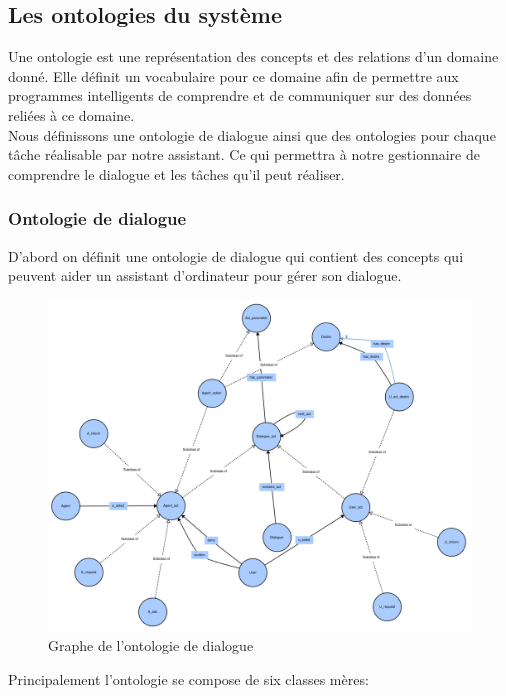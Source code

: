 \subsection{Les ontologies du système}\label{onto}
Une ontologie est une représentation des concepts et des relations d'un domaine donné. Elle définit un vocabulaire pour ce domaine afin de permettre aux programmes intelligents de comprendre  et de communiquer sur des données reliées à ce domaine.\\
Nous définissons une ontologie de dialogue ainsi que des ontologies pour chaque tâche réalisable par notre assistant. Ce qui permettra à notre gestionnaire de comprendre le dialogue et les tâches qu'il peut réaliser.
\subsubsection{Ontologie de dialogue}
D'abord on définit une ontologie de dialogue qui contient des concepts qui peuvent aider un assistant d'ordinateur pour gérer son dialogue.
\begin{figure}[H] 
	
	\centering
	\includegraphics[width=0.95\linewidth]{images/Conception/DM/main_onto.png}
	\caption{Graphe de l'ontologie de dialogue}
\end{figure}\label{mail_onto}
Principalement l'ontologie se compose de six classes mères:
